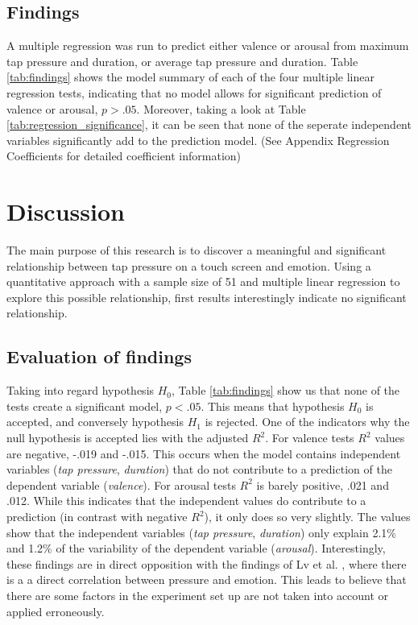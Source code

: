 \documentclass{sigchi}
\begin{document}
\subsection{Findings} %
\label{sub:findings}

A multiple regression was run to predict either valence or arousal from maximum tap pressure and duration, or average tap pressure and duration. Table \ref{tab:findings} shows the model summary of each of the four multiple linear regression tests, indicating that no model allows for significant prediction of valence or arousal, $p > .05$. Moreover, taking a look at Table \ref{tab:regression_significance}, it can be seen that none of the seperate independent variables significantly add to the prediction model. (See Appendix Regression Coefficients for detailed coefficient information)



\section{Discussion} %
\label{sec:discussion}
The main purpose of this research is to discover a meaningful and significant relationship between tap pressure on a touch screen and emotion. Using a quantitative approach with a sample size of 51 and multiple linear regression to explore this possible relationship, first results interestingly indicate no significant relationship.

\subsection{Evaluation of findings} %
\label{sub:evaluation_of_findings}
Taking into regard hypothesis $H_0$, Table \ref{tab:findings} show us that none of the tests create a significant model, $p < .05$. This means that hypothesis $H_0$ is accepted, and conversely hypothesis $H_1$ is rejected. One of the indicators why the null hypothesis is accepted lies with the adjusted $R^2$. For valence tests $R^2$ values are negative, -.019 and -.015. This occurs when the model contains independent variables (\textit{tap pressure}, \textit{duration}) that do not contribute to a prediction of the dependent variable (\textit{valence}). For arousal tests $R^2$ is barely positive, .021 and .012. While this indicates that the independent values do contribute to a prediction (in contrast with negative $R^2$), it only does so very slightly. The values show that the independent variables (\textit{tap pressure}, \textit{duration}) only explain 2.1\% and 1.2\% of the variability of the dependent variable (\textit{arousal}). Interestingly, these findings are in direct opposition with the findings of Lv et al. \cite{H.R.LvZ.L.LinW.J.Yin2008} , where there is a a direct correlation between pressure and emotion. This leads to believe that there are some factors in the experiment set up are not taken into account or applied erroneously.
\end{document}
